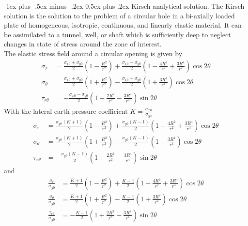 \documentclass[10pt,landscape,a4paper]{article}
\makeatletter
\renewcommand{\section}{\@startsection{section}{1}{0mm}%
	{-1ex plus -.5ex minus -.2ex}%
	{0.5ex plus .2ex}%
	{\normalfont\large\bfseries}}
\makeatother
\begin{document}
\begin{multicols}{3}
	\section{Kirsch analytical solution.}
	The Kirsch solution is the solution to the problem of a circular hole in a bi-axially loaded plate of homogeneous, isotropic, continuous, and linearly elastic material.
	It can be assimilated to a tunnel, well, or shaft which is sufficiently deep to neglect changes in state of stress around the zone of interest.\\
	The elastic stress field around a circular opening is given by
	\begin{align*}
		\sigma_r       & = \frac{\sigma_{x0}+\sigma_{y0}}{2}\left(1-\frac{R^2}{r^2}\right) + \frac{\sigma_{x0}-\sigma_{y0}}{2}\left(1-\frac{4R^2}{r^2}+\frac{3R^4}{r^4}\right)\cos2\theta \\
		\sigma_\theta  & = \frac{\sigma_{x0}+\sigma_{y0}}{2}\left(1+\frac{R^2}{r^2}\right) - \frac{\sigma_{x0}-\sigma_{y0}}{2}\left(1+\frac{3R^4}{r^4}\right)\cos2\theta                  \\
		\tau_{r\theta} & = -\frac{\sigma_{x0}-\sigma_{y0}}{2}\left(1+\frac{2R^2}{r^2}-\frac{3R^4}{r^4}\right)\sin2\theta
	\end{align*}
	With the lateral earth pressure coefficient $K=\frac{\sigma_{x0}}{\sigma_{y0}}$
	\begin{align*}
		\sigma_r       & = \frac{\sigma_{y0}(K+1)}{2}\left(1-\frac{R^2}{r^2}\right) + \frac{\sigma_{y0}(K-1)}{2}\left(1-\frac{4R^2}{r^2}+\frac{3R^4}{r^4}\right)\cos2\theta \\
		\sigma_\theta  & = \frac{\sigma_{y0}(K+1)}{2}\left(1+\frac{R^2}{r^2}\right) - \frac{\sigma_{y0}(K-1)}{2}\left(1+\frac{3R^4}{r^4}\right)\cos2\theta                  \\
		\tau_{r\theta} & = -\frac{\sigma_{y0}(K-1)}{2}\left(1+\frac{2R^2}{r^2}-\frac{3R^4}{r^4}\right)\sin2\theta
	\end{align*}
	and
	\begin{align*}
		\frac{\sigma_r}{\sigma_{y0}}       & = \frac{K+1}{2}\left(1-\frac{R^2}{r^2}\right) + \frac{K-1}{2}\left(1-\frac{4R^2}{r^2}+\frac{3R^4}{r^4}\right)\cos2\theta \\
		\frac{\sigma_\theta}{\sigma_{y0}}  & = \frac{K+1}{2}\left(1+\frac{R^2}{r^2}\right) - \frac{K-1}{2}\left(1+\frac{3R^4}{r^4}\right)\cos2\theta                  \\
		\frac{\tau_{r\theta}}{\sigma_{y0}} & = -\frac{K-1}{2}\left(1+\frac{2R^2}{r^2}-\frac{3R^4}{r^4}\right)\sin2\theta
	\end{align*}
	

\end{multicols}
\end{document}
